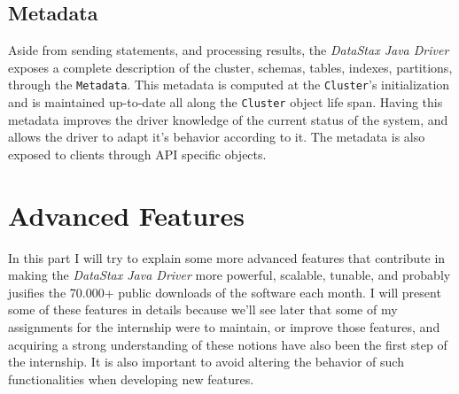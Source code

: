 \documentclass[a4paper]{report}
\newcommand{\djd}{\emph{DataStax Java Driver\xspace}}
\begin{document}
\subsection{Metadata}
Aside from sending statements, and processing results, the \djd{} exposes a complete description of the cluster, schemas, tables, indexes, partitions, through the \verb;Metadata;. This metadata is computed at the \verb;Cluster;'s initialization and is maintained up-to-date all along the \verb;Cluster; object life span. Having this metadata improves the driver knowledge of the current status of the system, and allows the driver to adapt it's behavior according to it. The metadata is also exposed to clients through API specific objects.



\section{Advanced Features}
In this part I will try to explain some more advanced features that contribute in making the \djd{} more powerful, scalable, tunable, and probably jusifies the 70.000+ public downloads of the software each month. I will present some of these features in details because we'll see later that some of my assignments for the internship were to maintain, or improve those features, and acquiring a strong understanding of these notions have also been the first step of the internship. It is also important to avoid altering the behavior of such functionalities when developing new features.
\end{document}
